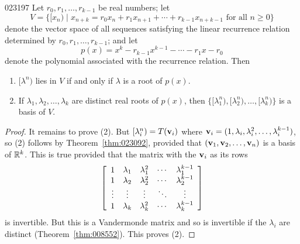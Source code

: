 \begin{theorem}{}{023197}
Let $r_{0}, r_{1}, \dots, r_{k-1}$ be real numbers; let
\begin{equation*}
V = \{[x_n) \mid  x_{n+k} = r_0x_n + r_1x_{n+1} + \cdots + r_{k-1}x_{n+k-1} \mbox{ for all } n \geq 0\}
\end{equation*}
denote the vector space of all sequences satisfying the linear recurrence relation determined by $r_{0}, r_{1}, \dots, r_{k-1}$; and let
\begin{equation*}
p(x) = x^k -r_{k-1}x^{k-1} - \cdots - r_1x - r_0
\end{equation*}
denote the polynomial associated with the recurrence relation. Then

\begin{enumerate}
\item $[\lambda^{n})$ lies in $V$ if and only if $\lambda$ is a root of $p(x)$.

\item If $\lambda_1, \lambda_2, \dots, \lambda_k$ are distinct real roots of $p(x)$, then $\{[\lambda_{1}^{n}), [\lambda_2^{n}), \dots, [\lambda_k^{n})\}$ is a basis of $V$.

\end{enumerate}
\end{theorem}

\begin{proof}
It remains to prove (2). But $[\lambda_{i}^{n}) = T(\textbf{v}_{i})$ where $\textbf{v}_{i} = (1, \lambda_{i}, \lambda_{i}^{2}, \dots, \lambda_{i}^{k-1})$, so (2) follows by Theorem~\ref{thm:023092}, provided that $(\textbf{v}_{1}, \textbf{v}_{2}, \dots, \textbf{v}_{n})$ is a basis of $\mathbb{R}^k$. This is true provided that the matrix with the $\textbf{v}_{i}$ as its rows
\begin{equation*}
\left[ \begin{array}{ccccc}
1 & \lambda_1 & \lambda_1^2 & \cdots & \lambda_1^{k-1} \\
1 & \lambda_2 & \lambda_2^2 & \cdots & \lambda_2^{k-1} \\
\vdots & \vdots & \vdots & \ddots & \vdots \\
1 & \lambda_k & \lambda_k^2 & \cdots & \lambda_k^{k-1}
\end{array} \right]
\end{equation*}
is invertible. But this is a Vandermonde matrix and so is invertible if the $\lambda_{i}$ are distinct (Theorem~\ref{thm:008552}). This proves (2).
\end{proof}

